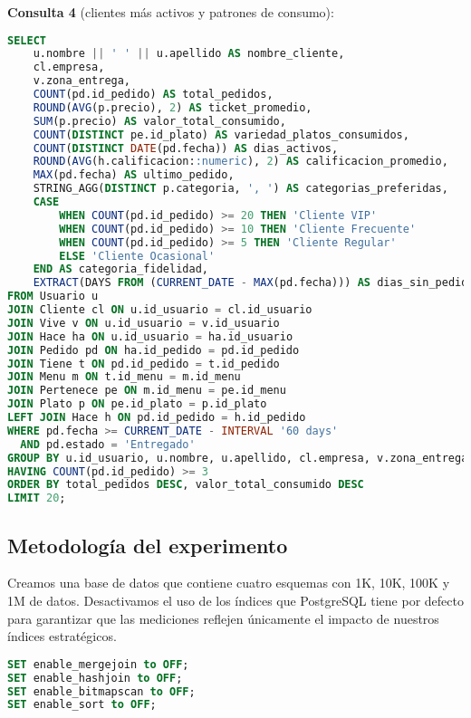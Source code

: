 \documentclass[12pt,a4paper]{article}
\begin{document}
\textbf{Consulta 4} (clientes más activos y patrones de consumo):
\begin{lstlisting}[language=SQL]
SELECT 
    u.nombre || ' ' || u.apellido AS nombre_cliente,
    cl.empresa,
    v.zona_entrega,
    COUNT(pd.id_pedido) AS total_pedidos,
    ROUND(AVG(p.precio), 2) AS ticket_promedio,
    SUM(p.precio) AS valor_total_consumido,
    COUNT(DISTINCT pe.id_plato) AS variedad_platos_consumidos,
    COUNT(DISTINCT DATE(pd.fecha)) AS dias_activos,
    ROUND(AVG(h.calificacion::numeric), 2) AS calificacion_promedio,
    MAX(pd.fecha) AS ultimo_pedido,
    STRING_AGG(DISTINCT p.categoria, ', ') AS categorias_preferidas,
    CASE 
        WHEN COUNT(pd.id_pedido) >= 20 THEN 'Cliente VIP'
        WHEN COUNT(pd.id_pedido) >= 10 THEN 'Cliente Frecuente'
        WHEN COUNT(pd.id_pedido) >= 5 THEN 'Cliente Regular'
        ELSE 'Cliente Ocasional'
    END AS categoria_fidelidad,
    EXTRACT(DAYS FROM (CURRENT_DATE - MAX(pd.fecha))) AS dias_sin_pedido
FROM Usuario u
JOIN Cliente cl ON u.id_usuario = cl.id_usuario
JOIN Vive v ON u.id_usuario = v.id_usuario
JOIN Hace ha ON u.id_usuario = ha.id_usuario
JOIN Pedido pd ON ha.id_pedido = pd.id_pedido
JOIN Tiene t ON pd.id_pedido = t.id_pedido
JOIN Menu m ON t.id_menu = m.id_menu
JOIN Pertenece pe ON m.id_menu = pe.id_menu
JOIN Plato p ON pe.id_plato = p.id_plato
LEFT JOIN Hace h ON pd.id_pedido = h.id_pedido
WHERE pd.fecha >= CURRENT_DATE - INTERVAL '60 days'
  AND pd.estado = 'Entregado'
GROUP BY u.id_usuario, u.nombre, u.apellido, cl.empresa, v.zona_entrega
HAVING COUNT(pd.id_pedido) >= 3
ORDER BY total_pedidos DESC, valor_total_consumido DESC
LIMIT 20;
\end{lstlisting}

\subsection{Metodología del experimento}
Creamos una base de datos que contiene cuatro esquemas con 1K, 10K, 100K y 1M de datos. Desactivamos el uso de los índices que PostgreSQL tiene por defecto para garantizar que las mediciones reflejen únicamente el impacto de nuestros índices estratégicos.

\begin{lstlisting}[language=SQL]
SET enable_mergejoin to OFF;
SET enable_hashjoin to OFF;
SET enable_bitmapscan to OFF;
SET enable_sort to OFF;
\end{lstlisting}
\end{document}
